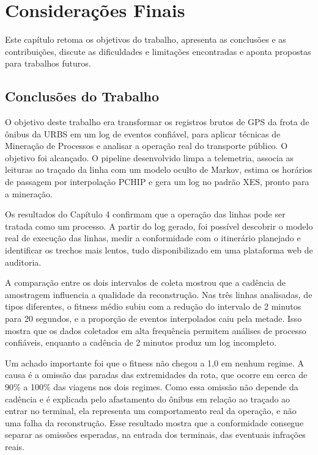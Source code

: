 
\chapter{Considerações Finais}\label{cap:conclusao}

Este capítulo retoma os objetivos do trabalho, apresenta as conclusões e as contribuições, discute as dificuldades e limitações encontradas e aponta propostas para trabalhos futuros.

\section{Conclusões do Trabalho}\label{sec:conclusoes}

O objetivo deste trabalho era transformar os registros brutos de GPS da frota de ônibus da URBS em um log de eventos confiável, para aplicar técnicas de Mineração de Processos e analisar a operação real do transporte público. O objetivo foi alcançado. O pipeline desenvolvido limpa a telemetria, associa as leituras ao traçado da linha com um modelo oculto de Markov, estima os horários de passagem por interpolação PCHIP e gera um log no padrão XES, pronto para a mineração.

Os resultados do Capítulo 4 confirmam que a operação das linhas pode ser tratada como um processo. A partir do log gerado, foi possível descobrir o modelo real de execução das linhas, medir a conformidade com o itinerário planejado e identificar os trechos mais lentos, tudo disponibilizado em uma plataforma web de auditoria.

A comparação entre os dois intervalos de coleta mostrou que a cadência de amostragem influencia a qualidade da reconstrução. Nas três linhas analisadas, de tipos diferentes, o fitness médio subiu com a redução do intervalo de 2 minutos para 20 segundos, e a proporção de eventos interpolados caiu pela metade. Isso mostra que os dados coletados em alta frequência permitem análises de processo confiáveis, enquanto a cadência de 2 minutos produz um log incompleto.

Um achado importante foi que o fitness não chegou a 1,0 em nenhum regime. A causa é a omissão das paradas das extremidades da rota, que ocorre em cerca de 90\% a 100\% das viagens nos dois regimes. Como essa omissão não depende da cadência e é explicada pelo afastamento do ônibus em relação ao traçado ao entrar no terminal, ela representa um comportamento real da operação, e não uma falha da reconstrução. Esse resultado mostra que a conformidade consegue separar as omissões esperadas, na entrada dos terminais, das eventuais infrações reais.


